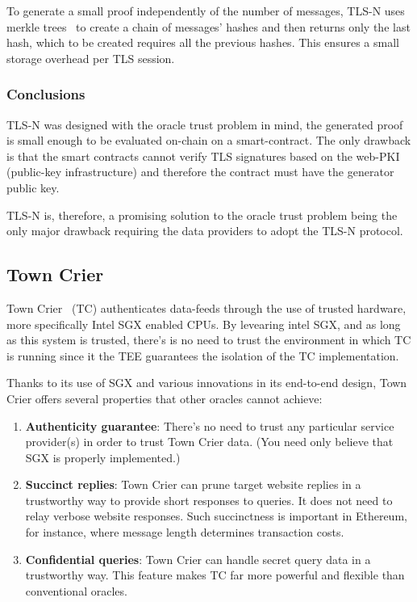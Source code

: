 To generate a small proof independently of the number of messages, TLS-N uses merkle trees~\cite{MerkleTrees} to create a chain of messages' hashes and then returns only the last hash, which to be created requires all the previous hashes. This ensures a small storage overhead per TLS session.


\subsubsection{Conclusions}
TLS-N was designed with the oracle trust problem in mind, the generated proof is small enough to be evaluated on-chain on a smart-contract. The only drawback is that the smart contracts cannot verify TLS signatures based on the web-PKI (public-key infrastructure) and therefore the contract must have the generator public key.

TLS-N is, therefore, a promising solution to the oracle trust problem being the only major drawback requiring the data providers to adopt the TLS-N protocol.


\subsection{Town Crier}

Town Crier~\citet{Zhang2016a} (TC) authenticates data-feeds through the use of trusted hardware, more specifically Intel SGX enabled CPUs. By levearing intel SGX, and as long as this system is trusted, there's is no need to trust the environment in which TC is running since it the TEE guarantees the isolation of the TC implementation.

Thanks to its use of SGX and various innovations in its end-to-end design, Town Crier offers several properties that other oracles cannot achieve:

\begin{enumerate}
    \item \textbf{Authenticity guarantee}: There's no need to trust any particular service provider(s) in order to trust Town Crier data. (You need only believe that SGX is properly implemented.)
    \item \textbf{Succinct replies}: Town Crier can prune target website replies in a trustworthy way to provide short responses to queries. It does not need to relay verbose website responses. Such succinctness is important in Ethereum, for instance, where message length determines transaction costs.
    \item \textbf{Confidential queries}: Town Crier can handle secret query data in a trustworthy way. This feature makes TC far more powerful and flexible than conventional oracles.
\end{enumerate}


